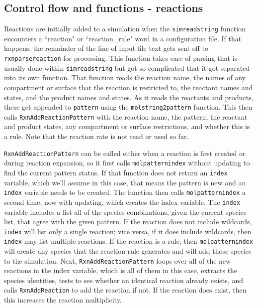 \documentclass {book}
\begin{document}
\subsection*{Control flow and functions - reactions}

Reactions are initially added to a simulation when the \texttt{simreadstring} function encounters a ``reaction" or ``reaction\_rule" word in a configuration file. If that happens, the remainder of the line of input file text gets sent off to \texttt{rxnparsereaction} for processing. This function takes care of parsing that is usually done within \texttt{simreadstring} but got so complicated that it got separated into its own function. That function reads the reaction name, the names of any compartment or surface that the reaction is restricted to, the reactant names and states, and the product names and states. As it reads the reactants and products, these get appended to \texttt{pattern} using the \texttt{molstring2pattern} function. This then calls \texttt{RxnAddReactionPattern} with the reaction name, the pattern, the reactant and product states, any compartment or surface restrictions, and whether this is a rule. Note that the reaction rate is not read or used so far.

\texttt{RxnAddReactionPattern} can be called either when a reaction is first created or during reaction expansion, so it first calls \texttt{molpatternindex} without updating to find the current pattern status. If that function does not return an \texttt{index} variable, which we'll assume in this case, that means the pattern is new and an \texttt{index} variable needs to be created. The function then calls \texttt{molpatternindex} a second time, now with updating, which creates the index variable. The \texttt{index} variable includes a list all of the species combinations, given the current species list, that agree with the given pattern. If the reaction does not include wildcards, \texttt{index} will list only a single reaction; vice versa, if it does include wildcards, then \texttt{index} may list multiple reactions. If the reaction is a rule, then \texttt{molpatternindex} will create any species that the reaction rule generates and will add those species to the simulation. Next, \texttt{RxnAddReactionPattern} loops over all of the new reactions in the index variable, which is all of them in this case, extracts the species identities, tests to see whether an identical reaction already exists, and calls \texttt{RxnAddReaction} to add the reaction if not. If the reaction does exist, then this increases the reaction multiplicity.
\end{document}
